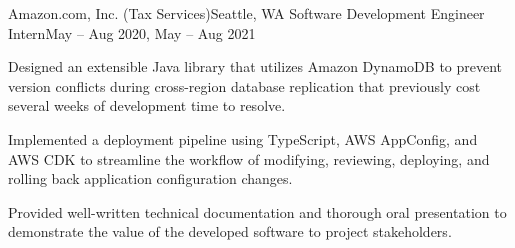 \begin{ritemize}
{Amazon.com, Inc. (Tax Services)}{Seattle, WA}
{Software Development Engineer Intern}{May -- Aug 2020, May -- Aug 2021}
	\item Designed an extensible Java library that utilizes Amazon DynamoDB to prevent version conflicts during cross-region database replication that previously cost several weeks of development time to resolve.
	\item Implemented a deployment pipeline using TypeScript, AWS AppConfig, and AWS CDK to streamline the workflow of modifying, reviewing, deploying, and rolling back application configuration changes.
	\item Provided well-written technical documentation and thorough oral presentation to demonstrate the value of the developed software to project stakeholders.
\end{ritemize}